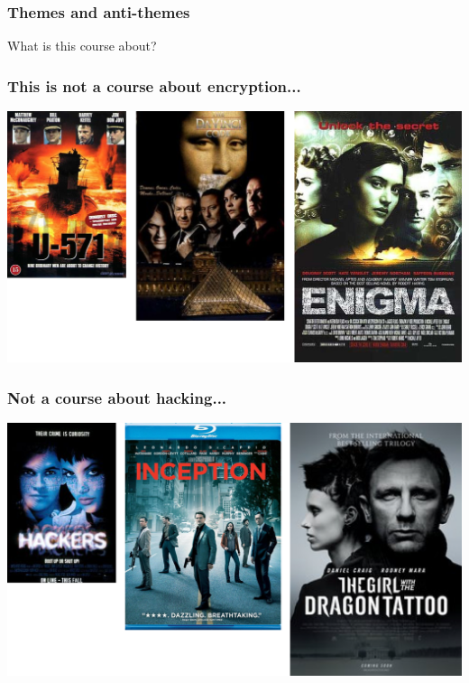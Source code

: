 \documentclass[10pt]{beamer}
\begin{document}

\begin{frame}

\frametitle{Themes and anti-themes}

What is this course about?
\\[2em]

\end{frame}


\begin{frame}

\frametitle{This is not a course about encryption...}

\hspace*{-1.5em}
\includegraphics[width=1.1\textwidth]{crypto.png}

\end{frame}


\begin{frame}

\frametitle{Not a course about hacking...}

\hspace*{-1.5em}
\includegraphics[width=1.1\textwidth]{hacking.png}

\end{frame}
\end{document}
